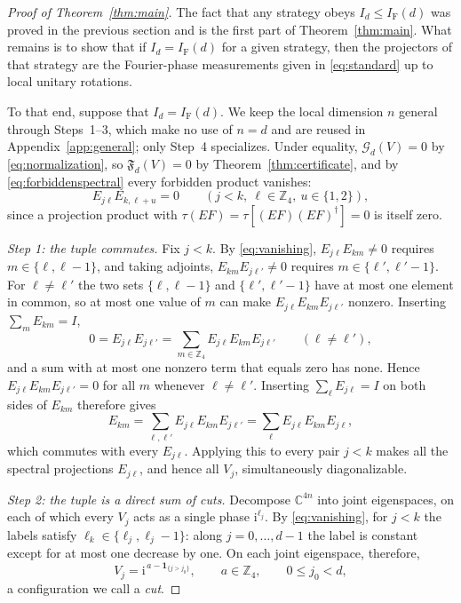 \documentclass[aps,prl,reprint,superscriptaddress,longbibliography,floatfix,raggedbottom]{revtex4-2}
\newcommand{\C}{\mathbb C}
\newcommand{\Z}{\mathbb Z}
\newcommand{\ii}{\mathrm i}
\newcommand{\ind}{\mathbf 1}
\newcommand{\tr}{\tau}
\newcommand{\IF}{I_{\mathrm F}}
\newcommand{\Fd}{\mathfrak F_d}
\newcommand{\Gd}{\mathcal G_d}
\begin{document}
\begin{proof}[Proof of Theorem~\ref{thm:main}]
The fact that any strategy obeys $I_d \leq \IF(d)$ was proved in the previous section and is the first part of Theorem~\ref{thm:main}. What remains is to show that if $I_d = \IF(d)$ for a given strategy, then the projectors of that strategy are the Fourier-phase measurements given in \eqref{eq:standard} up to local unitary rotations.

To that end, suppose that $I_d=\IF(d)$. We
keep the local dimension $n$ general through Steps~1--3, which make no
use of $n=d$ and are reused in Appendix~\ref{app:general}; only
Step~4 specializes. Under equality,
$\Gd(V)=0$ by \eqref{eq:normalization}, so $\Fd(V)=0$ by
Theorem~\ref{thm:certificate}, and by \eqref{eq:forbiddenspectral}
every forbidden product vanishes:
\begin{equation}\label{eq:vanishing}
E_{j\ell}E_{k,\ell+u}=0\qquad(j<k,\ \ell\in\Z_4,\ u\in\{1,2\}),
\end{equation}
since a projection product with $\tr(EF)=\tr[(EF)(EF)^\dagger]=0$ is
itself zero.

\emph{Step 1: the tuple commutes.}
Fix $j<k$. By \eqref{eq:vanishing}, $E_{j\ell}E_{km}\ne0$ requires
$m\in\{\ell,\ell-1\}$, and taking adjoints, $E_{km}E_{j\ell'}\ne0$
requires $m\in\{\ell',\ell'-1\}$. For $\ell\ne\ell'$ the two sets
$\{\ell,\ell-1\}$ and $\{\ell',\ell'-1\}$ have at most one element in
common, so at most one value of $m$ can make
$E_{j\ell}E_{km}E_{j\ell'}$ nonzero. Inserting $\sum_mE_{km}=I$,
\[
0=E_{j\ell}E_{j\ell'}=\sum_{m\in\Z_4}E_{j\ell}E_{km}E_{j\ell'}
\qquad(\ell\ne\ell'),
\]
and a sum with at most one nonzero term that equals zero has none.
Hence $E_{j\ell}E_{km}E_{j\ell'}=0$ for all $m$ whenever
$\ell\ne\ell'$. Inserting $\sum_\ell E_{j\ell}=I$ on both sides of
$E_{km}$ therefore gives
\[
E_{km}=\sum_{\ell,\ell'}E_{j\ell}E_{km}E_{j\ell'}
=\sum_\ell E_{j\ell}E_{km}E_{j\ell},
\]
which commutes with every $E_{j\ell}$. Applying this to every pair
$j<k$ makes all the spectral projections $E_{j\ell}$, and hence all
$V_j$, simultaneously diagonalizable.

\emph{Step 2: the tuple is a direct sum of cuts.}
Decompose $\C^{4n}$ into joint eigenspaces, on each of which every
$V_j$ acts as a single phase $\ii^{\ell_j}$. By \eqref{eq:vanishing}, for $j<k$ the
labels satisfy $\ell_k\in\{\ell_j,\ell_j-1\}$: along $j=0,\dots,d-1$
the label is constant except for at most one decrease by one. On each
joint eigenspace, therefore,
\begin{equation}\label{eq:cuts}
V_j=\ii^{\,a-\ind_{\{j>j_0\}}},
\qquad a\in\Z_4,\qquad 0\le j_0<d,
\end{equation}
a configuration we call a \emph{cut}.


\end{proof}
\end{document}
